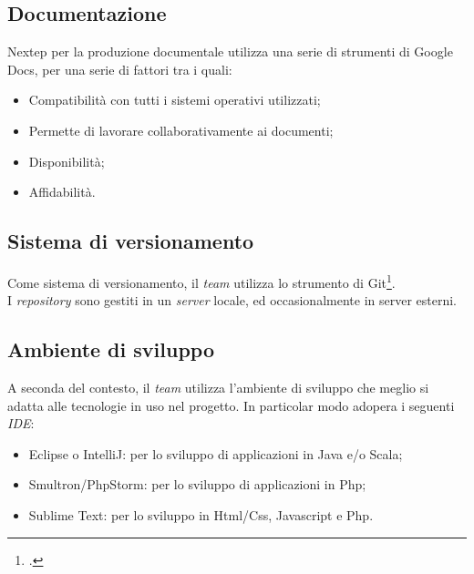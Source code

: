 \subsection{Documentazione}
Nextep per la produzione documentale utilizza una serie di strumenti di Google Docs, per una serie di fattori tra i quali:
\begin{itemize}
\item Compatibilità con tutti i sistemi operativi utilizzati;
\item Permette di lavorare collaborativamente ai documenti;
\item Disponibilità;
\item Affidabilità.
\end{itemize}
\subsection{Sistema di versionamento}
Come sistema di versionamento, il \emph{team} utilizza lo strumento di Git\footcite{https://git-scm.com/}.\\I \emph{repository} sono gestiti in un \emph{server} locale, ed occasionalmente in server esterni.
\subsection{Ambiente di sviluppo}
A seconda del contesto, il \emph{team} utilizza l'ambiente di sviluppo che meglio si adatta alle tecnologie in uso nel progetto. In particolar modo adopera i seguenti \emph{IDE}:
\begin{itemize}
\item Eclipse o IntelliJ: per lo sviluppo di applicazioni in Java e/o Scala;
\item Smultron/PhpStorm: per lo sviluppo di applicazioni in Php;
\item Sublime Text: per lo sviluppo in Html/Css, Javascript e Php.
\end{itemize}
\newpage
